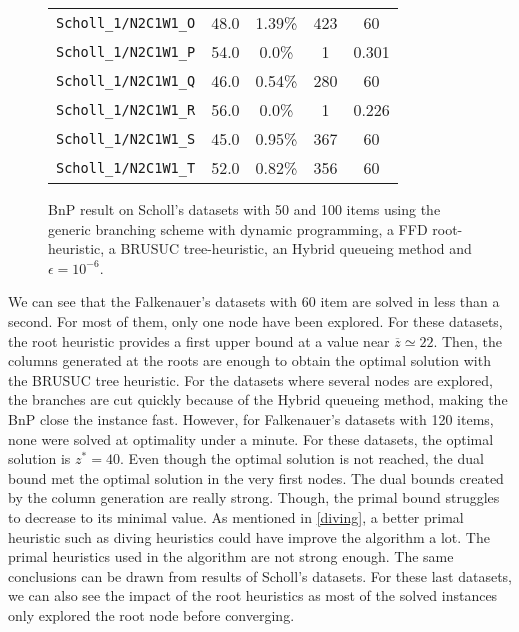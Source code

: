\begin{figure}[!ht]
{\begin{minipage}{0.47\linewidth}
\begin{tabular}{|ccccc|}
			\texttt{Scholl\_1/N2C1W1\_O} & 48.0           & 1.39\% & 423             & 60      \\
			\texttt{Scholl\_1/N2C1W1\_P} & 54.0           & 0.0\%  & 1               & 0.301       \\
			\texttt{Scholl\_1/N2C1W1\_Q} & 46.0           & 0.54\% & 280             & 60      \\
			\texttt{Scholl\_1/N2C1W1\_R} & 56.0           & 0.0\%  & 1               & 0.226       \\
			\texttt{Scholl\_1/N2C1W1\_S} & 45.0           & 0.95\% & 367             & 60      \\
			\texttt{Scholl\_1/N2C1W1\_T} & 52.0           & 0.82\% & 356             & 60     \\
			\hline
		\end{tabular}
	\end{minipage}
	}
	\caption{BnP result on Scholl's datasets with 50 and 100 items using the generic branching scheme with dynamic programming, a FFD root-heuristic, a BRUSUC tree-heuristic, an Hybrid queueing method and $\epsilon=10^{-6}$.}
\end{figure}

We can see that the Falkenauer's datasets with 60 item are solved in less than a second. For most of them, only one node have been explored. For these datasets, the root heuristic provides a first upper bound at a value near $\overline{z} \simeq 22$. Then, the columns generated at the roots are enough to obtain the optimal solution with the BRUSUC tree heuristic. For the datasets where several nodes are explored, the branches are cut quickly because of the Hybrid queueing method, making the BnP close the instance fast. However, for Falkenauer's datasets with 120 items, none were solved at optimality under a minute. For these datasets, the optimal solution is $z^* = 40$. Even though the optimal solution is not reached, the dual bound met the optimal solution in the very first nodes. The dual bounds created by the column generation are really strong. Though, the primal bound struggles to decrease to its minimal value.  As mentioned in \ref{diving}, a better primal heuristic such as diving heuristics could have improve the algorithm a lot. The primal heuristics used in the algorithm are not strong enough. The same conclusions can be drawn from results of Scholl's datasets. For these last datasets, we can also see the impact of the root heuristics as most of the solved instances only explored the root node before converging.

